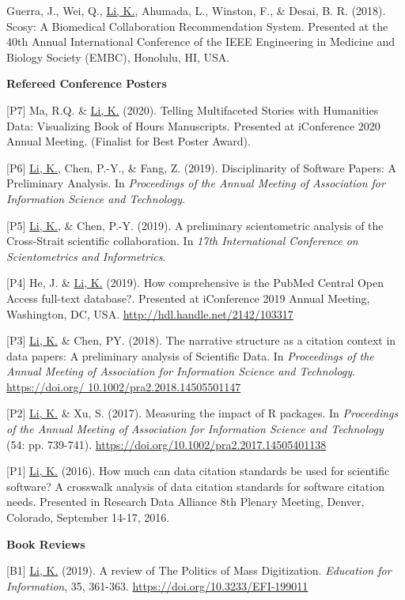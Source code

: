 \documentclass[margin, 10pt]{res} %
\begin{document}
\begin{resume}
[S1] Guerra, J., Wei, Q., \underline{Li, K.}, Ahumada, L., Winston, F., \& Desai, B. R. (2018). Scosy: A Biomedical Collaboration Recommendation System. Presented at the 40th Annual International Conference of the IEEE Engineering in Medicine and Biology Society (EMBC), Honolulu, HI, USA.

\textbf{Refereed Conference Posters}

[P7] Ma, R.Q. \& \underline{Li, K.} (2020). Telling Multifaceted Stories with Humanities Data: Visualizing Book of Hours Manuscripts. Presented at iConference 2020 Annual Meeting. (Finalist for Best Poster Award).

[P6] \underline{Li, K.}, Chen, P.-Y., \& Fang, Z. (2019). Disciplinarity of Software Papers: A Preliminary Analysis. In \textit{Proceedings of the Annual Meeting of Association for Information Science and Technology}.

[P5] \underline{Li, K.}, \& Chen, P.-Y. (2019). A preliminary scientometric analysis of the Cross-Strait scientific collaboration. In \textit{17th International Conference on Scientometrics and Informetrics}.

[P4] He, J. \& \underline{Li, K.} (2019). How comprehensive is the PubMed Central Open Access full-text database?. Presented at iConference 2019 Annual Meeting, Washington, DC, USA. \href{http://hdl.handle.net/2142/103317}{http://hdl.handle.net/2142/103317}

[P3] \underline{Li, K.} \& Chen, PY. (2018). The narrative structure as a citation context in data papers: A preliminary analysis of Scientific Data. In \textit{Proceedings of the Annual Meeting of Association for Information Science and Technology}. \href{https://doi.org/10.1002/pra2.2018.14505501147}{https://doi.org/ 10.1002/pra2.2018.14505501147}

[P2] \underline{Li, K.} \& Xu, S. (2017). Measuring the impact of R packages. In \textit{Proceedings of the Annual Meeting of Association for Information Science and Technology} (54: pp. 739-741). \href{https://doi.org/10.1002/pra2.2017.14505401138}{https://doi.org/10.1002/pra2.2017.14505401138}

[P1] \underline{Li, K.} (2016). How much can data citation standards be used for scientific software? A crosswalk analysis of data citation standards for software citation needs. Presented in Research Data Alliance 8th Plenary Meeting, Denver, Colorado, September 14-17, 2016.

\textbf{Book Reviews}

[B1] \underline{Li, K.} (2019). A review of The Politics of Mass Digitization. \textit{Education for Information}, 35, 361-363. \href{https://doi.org/10.3233/EFI-199011}{https://doi.org/10.3233/EFI-199011}


\end{resume}
\end{document}
